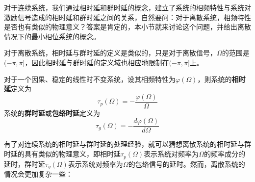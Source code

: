 对于连续系统，我们通过相时延和群时延的概念，建立了系统的相频特性与系统对激励信号造成的相时延和群时延之间的关系，自然要问：对于离散系统，相频特性是否也有类似的物理意义？答案是肯定的，本小节就来讨论这个问题，并给出离散情况下的最小相位系统的概念。

对于离散系统，相时延与群时延的定义是类似的，只是对于离散信号，$\Omega$的范围是$(-\pi,\pi]$，因此相时延与群时延的定义域也相应地限制在$(-\pi,\pi]$上。

\begin{definition}[相时延与群时延]
    对于一个因果、稳定的线性时不变系统，设其相频特性为$\varphi(\Omega)$，则系统的\textbf{相时延}定义为
    $$\tau_p(\Omega)=-\frac{\varphi(\Omega)}{\Omega}$$
    系统的\textbf{群时延}或\textbf{包络时延}定义为
    $$\tau_g(\Omega)=-\frac{d\varphi(\Omega)}{d\Omega}$$
\end{definition}

有了对连续系统的相时延与群时延的处理经验，就可以猜想离散系统的相时延与群时延的具有类似的物理意义，即相时延$\tau_p(\Omega)$表示系统对频率为$\Omega$的频率成分的延时，群时延$\tau_g(\Omega)$表示系统对频率为$\Omega$的包络信号的延时。然而，离散系统的情况会更加复杂一些：

